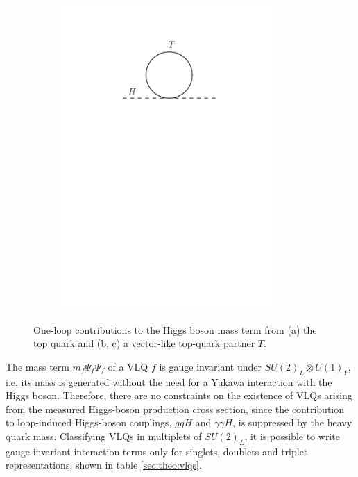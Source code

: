 \begin{figure}[h!]
\begin{subfigure}{0.33\textwidth}
  \includegraphics[width=0.9\textwidth]{figures/Theory/loop_T_good.pdf}
  \caption{}
  \label{}
\end{subfigure}

\captionsetup{width=0.85\textwidth} \caption{\small One-loop contributions to the Higgs boson mass term from (a) the top quark and (b, c) a vector-like top-quark partner $T$.}
\label{fig:theo:VLQHiggsmass}
\end{figure}

The mass term $m_{f}\bar{\Psi}_{f}\Psi_{f}$ of a VLQ $f$ is gauge invariant under $SU(2)_{L} \otimes U(1)_{Y}$, i.e. its mass is generated without the need for a Yukawa interaction with the Higgs boson. Therefore, there are no constraints on the existence of VLQs arising from the measured Higgs-boson production cross section, since the contribution to loop-induced Higgs-boson couplings, $ggH$ and $\gamma\gamma H$, is suppressed by the heavy quark mass.
Classifying VLQs in multiplets of $SU(2)_{L}$, it is possible to write gauge-invariant interaction terms only for singlets, doublets and triplet representations, shown in table \ref{sec:theo:vlqs}. 

